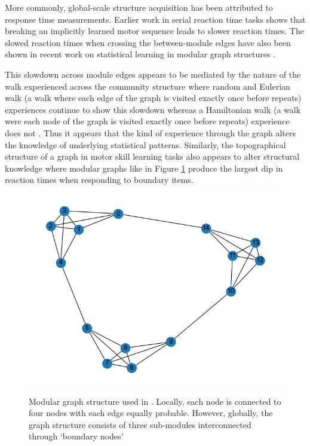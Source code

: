 More commonly, global-scale structure acquisition has been attributed to response time measurements. Earlier work in serial reaction time tasks \cite{nissen1987attentional, cleeremans1991learning} shows that breaking an implicitly learned motor sequence leads to slower reaction times. The slowed reaction times when crossing the between-module edges have also been shown in recent work on statistical learning in modular graph structures \cite{kahn2018network, lynn2020humans, karuza2017process, karuza2022value, karuza2019human, lynn2020human}. 

This slowdown across module edges appears to be mediated by the nature of the walk experienced across the community structure where random and Eulerian walk (a walk where each edge of the graph is visited exactly once before repeats) experiences continue to show this slowdown whereas a Hamiltonian walk (a walk were each node of the graph is visited exactly once before repeats) experience does not \cite{karuza2017process}. Thus it appears that the kind of experience through the graph alters the knowledge of underlying statistical patterns. Similarly, the topographical structure of a graph in motor skill learning tasks also appears to alter structural knowledge \cite{lynn2020abstract, lynn2020human, lynn2020humans} where modular graphs like in Figure \ref{fig:modular_graph} produce the largest dip in reaction times when responding to boundary items.

\begin{figure}[ht]
	\centering
	\caption{Modular graph structure used in \cite{schapiro2013neural}. Locally, each node is connected to four nodes with each edge equally probable. However, globally, the graph structure consists of three sub-modules interconnected through `boundary nodes'}
	\includegraphics[width = \textwidth]{chapter_notebooks/chapter_2/figures/modular_graph.png}
	\label{fig:modular_graph}
\end{figure}

